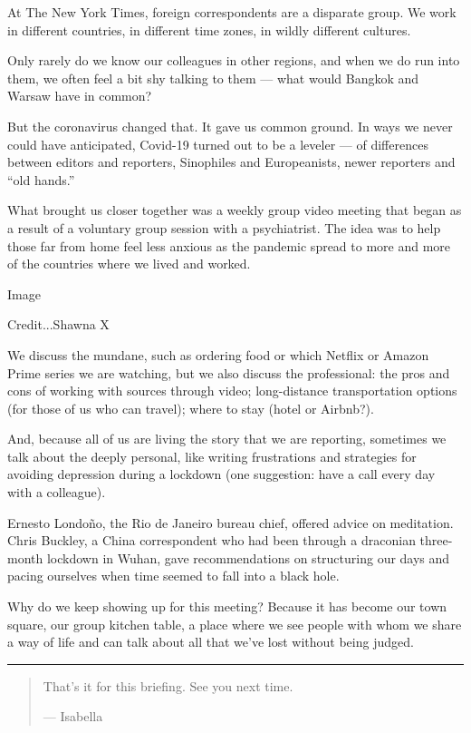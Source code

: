 At The New York Times, foreign correspondents are a disparate group. We
work in different countries, in different time zones, in wildly
different cultures.

Only rarely do we know our colleagues in other regions, and when we do
run into them, we often feel a bit shy talking to them --- what would
Bangkok and Warsaw have in common?

But the coronavirus changed that. It gave us common ground. In ways we
never could have anticipated, Covid-19 turned out to be a leveler --- of
differences between editors and reporters, Sinophiles and Europeanists,
newer reporters and ``old hands.''

What brought us closer together was a weekly group video meeting that
began as a result of a voluntary group session with a psychiatrist. The
idea was to help those far from home feel less anxious as the pandemic
spread to more and more of the countries where we lived and worked.

Image

Credit...Shawna X

We discuss the mundane, such as ordering food or which Netflix or Amazon
Prime series we are watching, but we also discuss the professional: the
pros and cons of working with sources through video; long-distance
transportation options (for those of us who can travel); where to stay
(hotel or Airbnb?).

And, because all of us are living the story that we are reporting,
sometimes we talk about the deeply personal, like writing frustrations
and strategies for avoiding depression during a lockdown (one
suggestion: have a call every day with a colleague).

Ernesto Londoño, the Rio de Janeiro bureau chief, offered advice on
meditation. Chris Buckley, a China correspondent who had been through a
draconian three-month lockdown in Wuhan, gave recommendations on
structuring our days and pacing ourselves when time seemed to fall into
a black hole.

Why do we keep showing up for this meeting? Because it has become our
town square, our group kitchen table, a place where we see people with
whom we share a way of life and can talk about all that we've lost
without being judged.

\begin{center}\rule{0.5\linewidth}{\linethickness}\end{center}

\begin{quote}
That's it for this briefing. See you next time.

--- Isabella
\end{quote}

